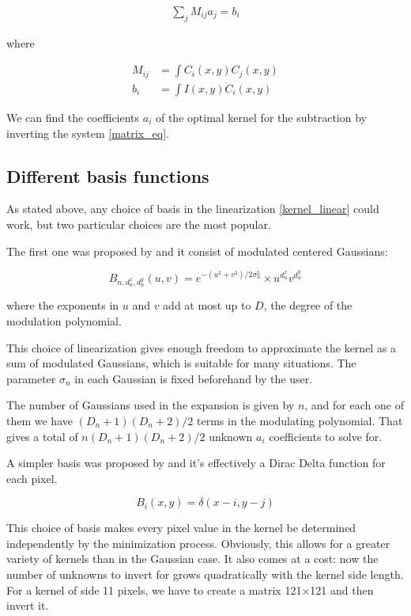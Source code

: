 \begin{align} \label{matrix_eq}
\sum_{j} M_{ij} a_{j}  =  b_{i}
\end{align}

where

\begin{align} \label{matrix_def}
M_{ij}  &=   \int  C_{i}(x,y)  C_{j}(x,y) \\
b_{i} &=  \int I(x,y) C_{i}(x,y)  \nonumber
\end{align}

We can find the coefficients $a_{i}$ of the optimal kernel for the subtraction by inverting the system \eqref{matrix_eq}.

\subsection*{Different basis functions}

As stated above, any choice of basis in the linearization \eqref{kernel_linear} could work, but two particular choices are the most popular.

The first one was proposed by \citet{1998ApJ...503..325A} and it consist of modulated centered Gaussians:

\begin{equation}
B_{n,d_n^{x}, d_n^{y}}(u,v) = e^{-(u^2+v^2)/2 \sigma_n^2} \times u^{d_n^{x}} v^{d_n^{y}}
\end{equation}

where the exponents in $u$ and $v$ add at most up to $D$, the degree of the modulation polynomial.

This choice of linearization gives enough freedom to approximate the kernel as a sum of modulated Gaussians, which is suitable for many situations.
The parameter $\sigma_n$ in each Gaussian is fixed beforehand by the user.

The number of Gaussians used in the expansion is given by $n$, and for each one of them we have $(D_n + 1)(D_n + 2)/2$ terms in the modulating polynomial.
That gives a total of $n(D_n + 1)(D_n + 2)/2$ unknown $a_i$ coefficients to solve for.

A simpler basis was proposed by \citet{2008MNRAS.386L..77B} and it's effectively a Dirac Delta function for each pixel.

\begin{equation}
B_{i}(x,y) = \delta(x-i,y-j)
\end{equation}

This choice of basis makes every pixel value in the kernel be determined independently by the minimization process.
Obviously, this allows for a greater variety of kernels than in the Gaussian case.
It also comes at a cost: now the number of unknowns to invert for grows quadratically with the kernel side length.
For a kernel of side 11 pixels, we have to create a matrix 121$\times$121 and then invert it. 

